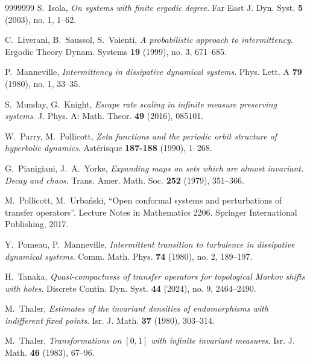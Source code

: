 \documentclass{amsart}
\theoremstyle{definition}
\theoremstyle{remark}
\theoremstyle{definition}
\numberwithin{equation}{section}
\begin{document}
\begin{thebibliography}{9999999}
 S.~Isola, \emph{On systems with finite ergodic degree}. Far East J. Dyn. Syst. \textbf{5} (2003), no. 1, 1--62.

 C.~Liverani, B.~Saussol, S.~Vaienti, \emph{A probabilistic approach to intermittency}. Ergodic Theory Dynam. Systems \textbf{19} (1999), no. 3, 671--685.

 P.~Manneville, \emph{Intermittency in dissipative dynamical systems}. Phys. Lett. A \textbf{79} (1980), no. 1, 33--35.

 S.~Munday, G.~Knight, \emph{Escape rate scaling in infinite measure preserving systems}. J. Phys. A: Math. Theor. \textbf{49} (2016), 085101.

 W.~Parry, M.~Pollicott, \emph{Zeta functions and the periodic orbit structure of hyperbolic dynamics}. Ast\'erisque \textbf{187-188} (1990), 1--268.

 G.~Pianigiani, J.~A.~Yorke, \emph{Expanding maps on sets which are almost invariant. Decay and chaos}. Trans. Amer. Math. Soc. \textbf{252} (1979), 351--366.

 M.~Pollicott, M.~Urba\'nski, ``Open conformal systems and perturbations of transfer operators''. Lecture Notes in Mathematics 2206. Springer International Publishing, 2017.

 Y.~Pomeau, P.~Manneville, \emph{Intermittent transition to turbulence in dissipative dynamical
systems}. Comm. Math. Phys. \textbf{74} (1980), no. 2, 189--197.

 H.~Tanaka, \emph{Quasi-compactness of transfer operators for topological Markov shifts with holes}. Discrete Contin. Dyn. Syst. \textbf{44} (2024), no. 9, 2464--2490.

 M.~Thaler, \emph{Estimates of the invariant densities of endomorphisms with indifferent fixed points}. Isr. J. Math. \textbf{37} (1980), 303--314.

 M.~Thaler, \emph{Transformations on $[0,1]$ with infinite invariant measures}. Isr. J. Math. \textbf{46} (1983), 67--96.

\end{thebibliography}
\end{document}
